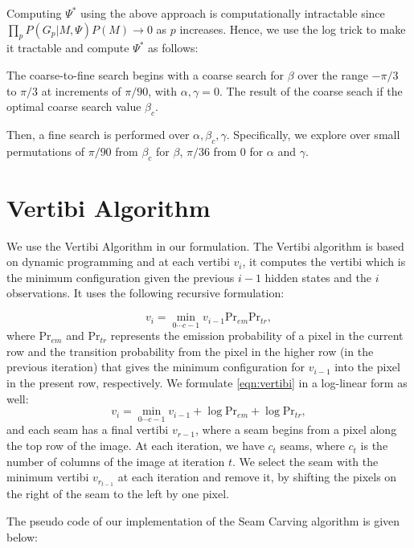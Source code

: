 \documentclass[a4paper]{article}
\begin{document}
	Computing $\Psi^*$ using the above approach is computationally intractable since $\prod_p P(G_p|M,\Psi)P(M) \rightarrow 0$ as $p$ increases. Hence, we use the log trick to make it tractable and compute $\Psi^*$ as follows:
	
	The coarse-to-fine search begins with a coarse search for $\beta$ over the range $-\pi / 3$ to $\pi / 3$ at increments of $\pi / 90$, with $\alpha, \gamma = 0$. The result of the coarse seach if the optimal coarse search value $\beta_c$.
	
	Then, a fine search is performed over $\alpha, \beta_c, \gamma$. Specifically, we explore over small permutations of $\pi / 90$ from $\beta_c$ for $\beta$,  $\pi / 36$ from $0$ for $\alpha$ and $\gamma$.
	
	
	\section{Vertibi Algorithm}
	
	We use the Vertibi Algorithm in our formulation. The Vertibi algorithm is based on dynamic programming and at each vertibi $v_i$, it computes the vertibi which is the minimum configuration given the previous $i-1$ hidden states and the $i$ observations. It uses the following recursive formulation:
	
	\begin{equation}
		v_i = \min_{0\cdots c-1} v_{i-1}\text{Pr}_{em}\text{Pr}_{tr},
		\label{eqn:vertibi}
	\end{equation}
	where $\text{Pr}_{em}$ and $\text{Pr}_{tr}$ represents the emission probability of a pixel in the current row and the transition probability from the pixel in the higher row (in the previous iteration) that gives the minimum configuration for $v_{i-1}$ into the pixel in the present row, respectively. We formulate \ref{eqn:vertibi} in a log-linear form as well:
	\begin{equation}
		v_i = \min_{0\cdots c-1} v_{i-1} + \log\text{Pr}_{em} + \log\text{Pr}_{tr},
	\end{equation}	
	and each seam has a final vertibi $v_{r-1}$, where a seam begins from a pixel along the top row of the image. At each iteration, we have $c_t$ seams, where $c_t$ is the number of columns of the image at iteration $t$. We select the seam with the minimum vertibi $v_{r_{t-1}}$  at each iteration and remove it, by shifting the pixels on the right of the seam to the left by one pixel. 
	
	The pseudo code of our implementation of the Seam Carving algorithm is given below: \\
	
\end{document}
